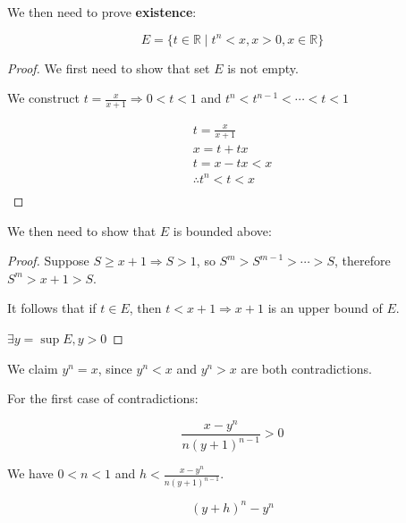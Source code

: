 \documentclass{article}
\begin{document}
    We then need to prove \textbf{existence}:
    
    \begin{displaymath}
        E = \{ t \in \mathbb{R} \mid t^{n} < x, x > 0, x \in \mathbb{R} \}
    \end{displaymath}
    
    \begin{proof}
        We first need to show that set $E$ is not empty.
        
        We construct $t = \frac{x}{x + 1} \Rightarrow 0 < t < 1$ and $t^{n} < t^{n - 1} < \cdots < t < 1$
        
        \begin{align*}
            t = \frac{x}{x + 1} \\
            x = t + tx \\
            t = x - tx < x \\
            \therefore t^{n} < t < x \\
        \end{align*}
    \end{proof}
    
    We then need to show that $E$ is bounded above:
    
    \begin{proof}
        Suppose $S \geq x + 1 \Rightarrow S > 1$, so $S^{m} > S^{m - 1} > \cdots > S$, therefore $S^{m} > x + 1 > S$.
        
        It follows that if $t \in E$, then $t < x + 1 \Rightarrow x + 1$ is an upper bound of $E$.
        
        $\exists y = \sup E, y > 0$
    \end{proof}

    We claim $y^{n} = x$, since $y^{n} < x$ and $y^{n} > x$ are both contradictions.
    
    For the first case of contradictions:
    
    \begin{displaymath}
        \frac{x - y^{n}}{n (y + 1)^{n - 1}} > 0
    \end{displaymath}
    
    We have $0 < n < 1$ and $h < \frac{x - y^{n}}{n (y + 1)^{n - 1}}$.
    
    \begin{displaymath}
        (y + h)^{n} - y^{n}
    \end{displaymath}
    
\end{document}
